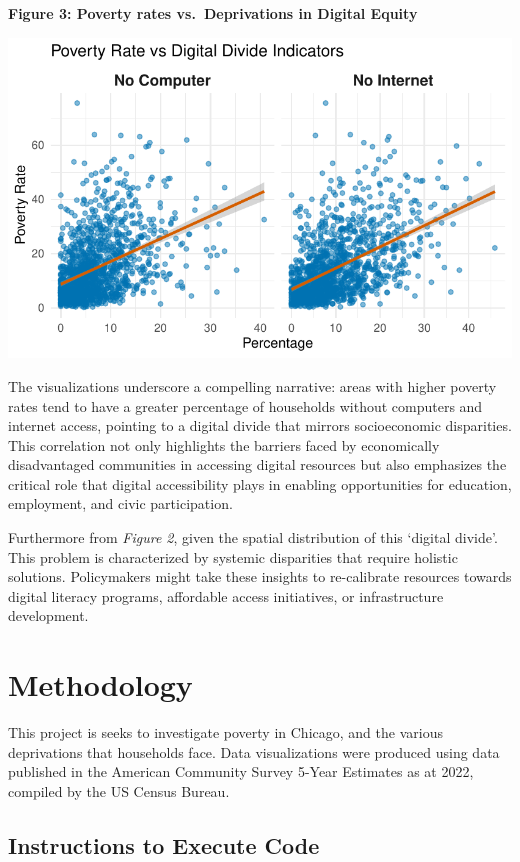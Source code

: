 \documentclass[
  letterpaper,
  DIV=11,
  numbers=noendperiod]{scrreprt}
\begin{document}
\textbf{Figure 3: Poverty rates vs.~Deprivations in Digital Equity}

\includegraphics{digital_divide_analysis_files/figure-pdf/viz3_etl-1.pdf}

The visualizations underscore a compelling narrative: areas with higher
poverty rates tend to have a greater percentage of households without
computers and internet access, pointing to a digital divide that mirrors
socioeconomic disparities. This correlation not only highlights the
barriers faced by economically disadvantaged communities in accessing
digital resources but also emphasizes the critical role that digital
accessibility plays in enabling opportunities for education, employment,
and civic participation.

Furthermore from \emph{Figure 2}, given the spatial distribution of this
`digital divide'. This problem is characterized by systemic disparities
that require holistic solutions. Policymakers might take these insights
to re-calibrate resources towards digital literacy programs, affordable
access initiatives, or infrastructure development.


\chapter{Methodology}\label{methodology}

This project is seeks to investigate poverty in Chicago, and the various
deprivations that households face. Data visualizations were produced
using data published in the American Community Survey 5-Year Estimates
as at 2022, compiled by the US Census Bureau.

\section{Instructions to Execute
Code}\label{instructions-to-execute-code}
\end{document}
